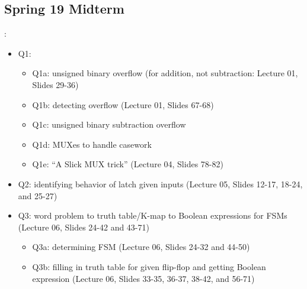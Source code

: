 \documentclass{../slides}
\begin{document}
\subsection{Spring 19 Midterm}
\begin{frame}{\secname: \subsecname}
    \begin{itemize}
        \item Q1:
        \begin{itemize}
            \item Q1a: unsigned binary overflow (for addition, not subtraction: Lecture 01, Slides 29-36)
            \item Q1b: detecting overflow (Lecture 01, Slides 67-68)
            \item Q1c: unsigned binary subtraction overflow
            \item Q1d: MUXes to handle casework
            \item Q1e: \enquote{A Slick MUX trick} (Lecture 04, Slides 78-82)
        \end{itemize}
        \item Q2: identifying behavior of latch given inputs (Lecture 05, Slides 12-17, 18-24, and 25-27)
        \item Q3: word problem to truth table/K-map to Boolean expressions for FSMs (Lecture 06, Slides 24-42 and 43-71)
        \begin{itemize}
            \item Q3a: determining FSM (Lecture 06, Slides 24-32 and 44-50)
            \item Q3b: filling in truth table for given flip-flop and getting Boolean expression (Lecture 06, Slides 33-35, 36-37, 38-42, and 56-71)
        \end{itemize}
    \end{itemize}
\end{frame}
\end{document}
